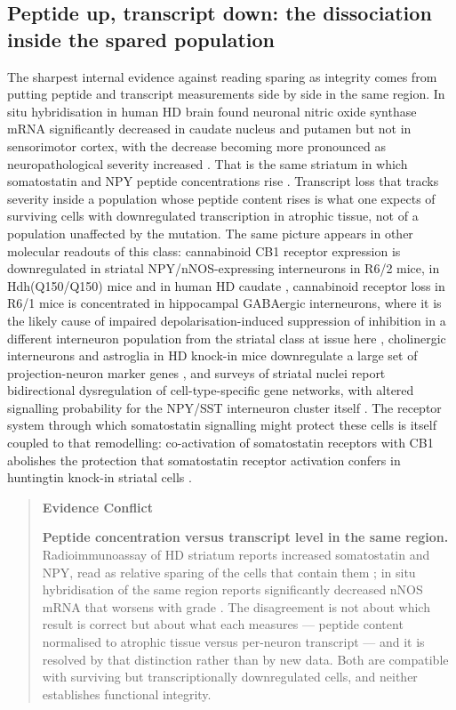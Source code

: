 \documentclass[11pt]{article}
\begin{document}
\subsection{Peptide up, transcript down: the dissociation inside the spared population}
\label{sec-06-peptide-transcript}

The sharpest internal evidence against reading sparing as integrity comes from putting peptide and transcript measurements side by side in the same region. In situ hybridisation in human HD brain found neuronal nitric oxide synthase mRNA significantly decreased in caudate nucleus and putamen but not in sensorimotor cortex, with the decrease becoming more pronounced as neuropathological severity increased \citep{Norris1996}. That is the same striatum in which somatostatin and NPY peptide concentrations rise \citep{Beal1988,Beal1991b}. Transcript loss that tracks severity inside a population whose peptide content rises is what one expects of surviving cells with downregulated transcription in atrophic tissue, not of a population unaffected by the mutation. The same picture appears in other molecular readouts of this class: cannabinoid CB1 receptor expression is downregulated in striatal NPY/nNOS-expressing interneurons in R6/2 mice, in Hdh(Q150/Q150) mice and in human HD caudate \citep{Horne2012}, cannabinoid receptor loss in R6/1 mice is concentrated in hippocampal GABAergic interneurons, where it is the likely cause of impaired depolarisation-induced suppression of inhibition in a different interneuron population from the striatal class at issue here \citep{DiFranco2025}, cholinergic interneurons and astroglia in HD knock-in mice downregulate a large set of projection-neuron marker genes \citep{Lee2020}, and surveys of striatal nuclei report bidirectional dysregulation of cell-type-specific gene networks, with altered signalling probability for the NPY/SST interneuron cluster itself \citep{Malaiya2021,Jiang2024}. The receptor system through which somatostatin signalling might protect these cells is itself coupled to that remodelling: co-activation of somatostatin receptors with CB1 abolishes the protection that somatostatin receptor activation confers in huntingtin knock-in striatal cells \citep{Zou2019}.

\begin{quote}
\noindent\textbf{Evidence Conflict}\par
\textbf{Peptide concentration versus transcript level in the same region.} Radioimmunoassay of HD striatum reports increased somatostatin and NPY, read as relative sparing of the cells that contain them \citep{Beal1988}; in situ hybridisation of the same region reports significantly decreased nNOS mRNA that worsens with grade \citep{Norris1996}. The disagreement is not about which result is correct but about what each measures --- peptide content normalised to atrophic tissue versus per-neuron transcript --- and it is resolved by that distinction rather than by new data. Both are compatible with surviving but transcriptionally downregulated cells, and neither establishes functional integrity.

\end{quote}
\end{document}

